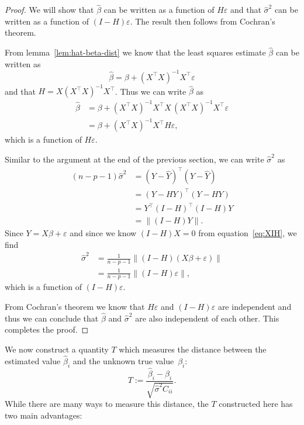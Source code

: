 \documentclass[
  a4paper,
]{article}
\theoremstyle{definition}
\theoremstyle{definition}
\theoremstyle{definition}
\theoremstyle{definition}
\theoremstyle{remark}
\begin{document}
\begin{proof}
We will show that \(\hat\beta\) can be written as a function of \(H\varepsilon\)
and that \(\hat\sigma^2\) can be written as a function of \((I-H)\varepsilon\).
The result then follows from Cochran's theorem.

From lemma~\ref{lem:hat-beta-dist}
we know that the least squares estimate \(\hat\beta\) can be written as
\begin{equation*}
  \hat\beta
  = \beta + (X^\top X)^{-1} X^\top \varepsilon
\end{equation*}
and that \(H = X (X^\top X)^{-1} X^\top\). Thus we can write \(\hat\beta\) as
\begin{align*}
  \hat\beta
  &= \beta + (X^\top X)^{-1} X^\top X \, (X^\top X)^{-1} X^\top \varepsilon\\
  &= \beta + (X^\top X)^{-1} X^\top H \varepsilon,
\end{align*}
which is a function of \(H\varepsilon\).

Similar to the argument at the end of the previous section, we can
write \(\hat\sigma^2\) as
\begin{align*}
  (n - p - 1) \hat\sigma^2
  &= (Y - \hat Y)^\top (Y - \hat Y) \\
  &= (Y - H Y)^\top (Y - H Y) \\
  &= Y^\top (I - H)^\top (I - H) Y \\
  &= \bigl\| (I - H) Y \|.
\end{align*}
Since \(Y = X\beta + \varepsilon\) and since we know \((I-H)X = 0\) from
equation~\eqref{eq:XIH}, we find
\begin{align*}
  \hat\sigma^2
  &= \frac{1}{n-p-1} \bigl\| (I - H) (X\beta + \varepsilon) \| \\
  &= \frac{1}{n-p-1} \bigl\| (I - H) \varepsilon\|,
\end{align*}
which is a function of \((I - H)\varepsilon\).

From Cochran's theorem we know that \(H \varepsilon\) and \((I-H)\varepsilon\) are independent
and thus we can conclude that \(\hat\beta\) and \(\hat\sigma^2\) are also
independent of each other. This completes the proof.
\end{proof}

We now construct a quantity \(T\) which measures the distance between
the estimated value \(\hat\beta_i\) and the unknown true value~\(\beta_i\):
\begin{equation}
  T
  := \frac{\hat\beta_i - \beta_i}{\sqrt{\hat\sigma^2 C_{ii}}}. \label{eq:single-T}
\end{equation}
While there are many ways to measure this distance, the \(T\) constructed
here has two main advantages:
\end{document}
